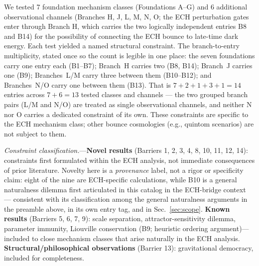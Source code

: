 \documentclass[aps,prd,twocolumn,superscriptaddress,showpacs,preprintnumbers,nofootinbib,longbibliography,floatfix]{revtex4-2}
\begin{document}
We tested 7 foundation mechanism classes (Foundations A--G) and 6
additional observational channels (Branches H, J, L, M, N, O; the ECH
perturbation gates enter through Branch H, which carries the two
logically independent entries B8 and B14) for the possibility of
connecting the ECH bounce to
late-time dark energy. Each test yielded a named structural constraint.
The branch-to-entry multiplicity, stated once so the count is legible in
one place: the seven foundations carry one entry each (B1--B7); Branch~H
carries two (B8, B14); Branch~J carries one (B9); Branches~L/M carry
three between them (B10--B12); and Branches~N/O carry one between them
(B13). That is $7+2+1+3+1=14$ entries across $7+6=13$ tested classes and
channels --- the two grouped branch pairs (L/M and N/O) are treated as
single observational channels, and neither N nor O carries a dedicated
constraint of its own.
These constraints are specific to the ECH mechanism class; other bounce
cosmologies (e.g., quintom scenarios) are not subject to them.

\textit{Constraint classification.}---\textbf{Novel results} (Barriers 1,
2, 3, 4, 8, 10, 11, 12, 14): constraints first formulated within the ECH
analysis, not immediate consequences of prior literature. Novelty here is
a \emph{provenance} label, not a rigor or specificity claim: eight of the
nine are ECH-specific calculations, while B10 is a general naturalness
dilemma first articulated in this catalog in the ECH-bridge context ---
consistent with its classification among the general naturalness
arguments in the preamble above, in its own entry tag, and in
Sec.~\ref{sec:scope}. \textbf{Known results} (Barriers 5, 6,
7, 9): scale separation, attractor-sensitivity dilemma, parameter
immunity, Liouville conservation (B9; heuristic ordering
argument)---included to close mechanism classes that arise naturally in
the ECH analysis. \textbf{Structural/philosophical observations} (Barrier
13): gravitational democracy, included for completeness.
\end{document}

